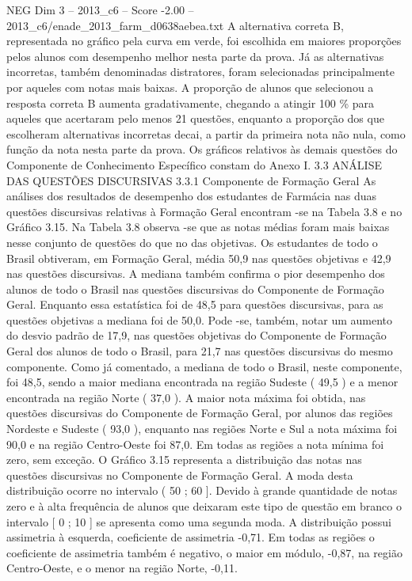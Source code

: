 \begin{textsample}{NEG Dim 3 – 2013\_c6 – Score -2.00 – 2013\_c6/enade\_2013\_farm\_d0638aebea.txt}
A alternativa correta B, representada no gráfico pela curva em verde, foi escolhida em maiores proporções pelos alunos com desempenho melhor nesta parte da prova.
Já as alternativas incorretas, também denominadas distratores, foram selecionadas principalmente por aqueles com notas mais baixas.
A proporção de alunos que selecionou a resposta correta B aumenta gradativamente, chegando a atingir 100 \% para aqueles que acertaram pelo menos 21 questões, enquanto a proporção dos que escolheram alternativas incorretas decai, a partir da primeira nota não nula, como função da nota nesta parte da prova.
Os gráficos relativos às demais questões do Componente de Conhecimento Específico constam do Anexo I. 3.3 ANÁLISE DAS QUESTÕES DISCURSIVAS 3.3.1 Componente de Formação Geral As análises dos resultados de desempenho dos estudantes de Farmácia nas duas questões discursivas relativas à Formação Geral encontram -se na Tabela 3.8 e no Gráfico 3.15.
Na Tabela 3.8 observa -se que as notas médias foram mais baixas nesse conjunto de questões do que no das objetivas.
Os estudantes de todo o Brasil obtiveram, em Formação Geral, média 50,9 nas questões objetivas e 42,9 nas questões discursivas.
A mediana também confirma o pior desempenho dos alunos de todo o Brasil nas questões discursivas do Componente de Formação Geral.
Enquanto essa estatística foi de 48,5 para questões discursivas, para as questões objetivas a mediana foi de 50,0.
Pode -se, também, notar um aumento do desvio padrão de 17,9, nas questões objetivas do Componente de Formação Geral dos alunos de todo o Brasil, para 21,7 nas questões discursivas do mesmo componente.
Como já comentado, a mediana de todo o Brasil, neste componente, foi 48,5, sendo a maior mediana encontrada na região Sudeste ( 49,5 ) e a menor encontrada na região Norte ( 37,0 ).
A maior nota máxima foi obtida, nas questões discursivas do Componente de Formação Geral, por alunos das regiões Nordeste e Sudeste ( 93,0 ), enquanto nas regiões Norte e Sul a nota máxima foi 90,0 e na região Centro-Oeste foi 87,0.
Em todas as regiões a nota mínima foi zero, sem exceção.
O Gráfico 3.15 representa a distribuição das notas nas questões discursivas no Componente de Formação Geral.
A moda desta distribuição ocorre no intervalo ( 50 ; 60 ].
Devido à grande quantidade de notas zero e à alta frequência de alunos que deixaram este tipo de questão em branco o intervalo [ 0 ; 10 ] se apresenta como uma segunda moda.
A distribuição possui assimetria à esquerda, coeficiente de assimetria -0,71.
Em todas as regiões o coeficiente de assimetria também é negativo, o maior em módulo, -0,87, na região Centro-Oeste, e o menor na região Norte, -0,11.

\end{textsample}
